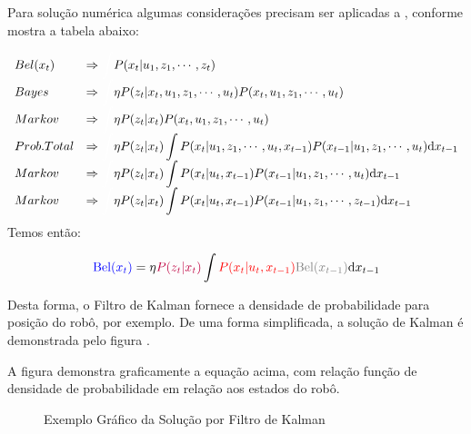 Para solução numérica algumas considerações precisam ser aplicadas a  , conforme mostra a tabela abaixo:

\begin{equation*}
    \begin{array}{ll}
        Bel(x_t) & \Rightarrow\textcolor{white}{\displaystyle\int} P(x_t| u_1, z_1,  \cdots, z_t) \\
        Bayes & \Rightarrow\textcolor{white}{\displaystyle\int} \eta P(z_t|x_t,  u_1, z_1,  \cdots,  u_t)P(x_t, u_1, z_1, \cdots, u_t) \\
        Markov & \Rightarrow\textcolor{white}{\displaystyle\int} \eta P(z_t|x_t)P(x_t, u_1, z_1, \cdots, u_t) \\
        Prob. Total & \Rightarrow\textcolor{white}{\displaystyle\int} \eta P(z_t|x_t)\displaystyle\int P(x_t| u_1, z_1, \cdots, u_t,x_{t-1})P(x_{t-1}| u_1, z_1, \cdots, u_t)\text{d}x_{t-1}\\
        Markov & \Rightarrow\textcolor{white}{\displaystyle\int} \eta P(z_t|x_t) \displaystyle\int P(x_t| u_t,x_{t-1})P(x_{t-1}| u_1, z_1, \cdots, u_t)\text{d}x_{t-1} \\
        Markov & \Rightarrow\textcolor{white}{\displaystyle\int} \eta P(z_t|x_t) \displaystyle\int P(x_t| u_t,x_{t-1}){P(x_{t-1}| u_1, z_1, \cdots, z_{t-1}}){\text{d}x_{t-1}} \\
    \end{array}   
\end{equation*}
Temos então:

\begin{equation*}
    \textcolor{blue}{\text{Bel}(x_t)} =\eta \textcolor{purple}{P(z_t|x_t)}\displaystyle\int \textcolor{red}{P(x_t| u_t,x_{t-1})}\textcolor{gray}{\text{Bel}(x_{t-1})}\text{d}x_{t-1}
\end{equation*}


Desta forma, o Filtro de Kalman fornece a densidade de probabilidade para posição do robô, por exemplo. De uma forma simplificada, a solução de Kalman é demonstrada pelo figura .

A figura  demonstra graficamente a equação acima, com relação função de densidade de probabilidade em relação aos estados do robô.
    
\begin{figure}[!ht]
    \centering
    
    \caption{Exemplo Gráfico da Solução por Filtro de Kalman}
    \label{fig::kalm1}
\end{figure}

